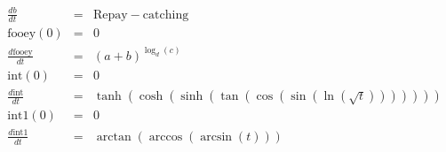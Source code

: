 \documentclass{article}
\begin{document}
\begin{eqnarray*}
\frac{ d b}{dt} &=&\mathrm{Repay}-\mathrm{catching}\\
\mathrm{fooey}(0)&=&0\\
\frac{ d \mathrm{fooey}}{dt} &=&\left(a+b\right)^{\log_{d}\left(c\right)}\\
\mathrm{int}(0)&=&0\\
\frac{ d \mathrm{int}}{dt} &=&\tanh\left(\cosh\left(\sinh\left(\tan\left(\cos\left(\sin\left(\ln\left(\sqrt{ t }\right)\right)\right)\right)\right)\right)\right)\\
\mathrm{int1}(0)&=&0\\
\frac{ d \mathrm{int1}}{dt} &=&\arctan\left(\arccos\left(\arcsin\left( t \right)\right)\right)\\
\end{eqnarray*}
\end{document}
